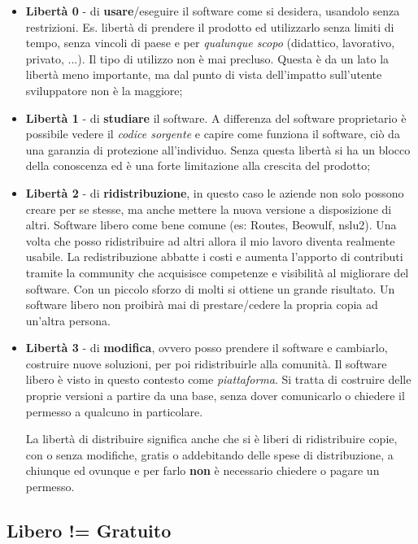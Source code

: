 \begin{itemize}

\item \textbf{Libertà 0} - di \textbf{usare}/eseguire il software come si desidera, usandolo senza restrizioni. Es. libertà di prendere il prodotto ed utilizzarlo senza limiti di tempo, senza vincoli di paese e per \textit{qualunque scopo} (didattico, lavorativo, privato, ...). Il tipo di utilizzo non è mai precluso. Questa è da un lato la libertà meno importante, ma dal punto di vista dell'impatto sull'utente sviluppatore non è la maggiore;
\item \textbf{Libertà 1} - di \textbf{studiare} il software. A differenza del software proprietario è possibile vedere il \textit{codice sorgente} e capire come funziona il software, ciò da una garanzia di protezione all'individuo. Senza questa libertà si ha un blocco della conoscenza ed è una forte limitazione alla crescita del prodotto;
\item \textbf{Libertà 2} - di \textbf{ridistribuzione}, in questo caso le aziende non solo possono creare per se stesse, ma anche mettere la nuova versione a disposizione di altri. Software libero come bene comune (es: Routes, Beowulf, nslu2). Una volta che posso ridistribuire ad altri allora il mio lavoro diventa realmente usabile. La redistribuzione abbatte i costi e aumenta l'apporto di contributi tramite la community che acquisisce competenze e visibilità al migliorare del software. Con un piccolo sforzo di molti si ottiene un grande risultato. Un software libero non proibirà mai di prestare/cedere la propria copia ad un'altra persona.
\item \textbf{Libertà 3} - di \textbf{modifica}, ovvero posso prendere il software e cambiarlo, costruire nuove soluzioni, per poi ridistribuirle alla comunità. Il software libero è visto in questo contesto come \textit{piattaforma}. Si tratta di costruire delle proprie versioni a partire da una base, senza dover comunicarlo o chiedere il permesso a qualcuno in particolare.

La libertà di distribuire significa anche che si è liberi di ridistribuire copie, con o senza modifiche, gratis o addebitando delle spese di distribuzione, a chiunque ed ovunque e per farlo \textbf{non} è necessario chiedere o pagare un permesso.


\end{itemize}

\subsection{Libero != Gratuito}


